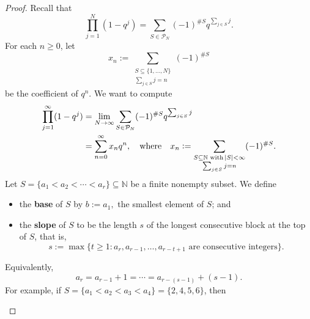 \documentclass{article}
\theoremstyle{definition}
\renewcommand{\emph}[1]{\textbf{#1}}
\begin{document}
\begin{proof}
Recall that \[
\prod_{j=1}^N(1-q^j)=\sum_{S\in\mathcal P_N}(-1)^{\#S}q^{\sum_{j\in S}j}.
\] For each $n\ge 0$, let \[
x_n
:=
\sum_{\substack{S\subseteq\{1,\dots,N\}\\ \sum_{j\in S}j=n}}(-1)^{\#S}
\] be the coefficient of $q^n$.
We want to compute \begin{align*}
\prod_{j=1}^\infty(1-q^j)&=\lim_{N\to\infty}\sum_{S\in\mathcal P_N}(-1)^{\#S}q^{\sum_{j\in S}j}\\
&=
\sum_{n=0}^\infty x_nq^n,\quad\text{where}\quad
x_n:=\sum_{\substack{S\subseteq\mathbb N\text{ with } \abs{S}<\infty\\ \sum_{j\in S}j=n}}(-1)^{\#S}.
\end{align*}
Let $
S=\{a_1<a_2<\cdots<a_r\}\subseteq\mathbb N$
be a finite nonempty subset. We define 
\begin{itemize}
	\item the \emph{base} of $S$ by $b:=a_1,$ the smallest element of $S$; and
	\item the \emph{slope} of $S$ to be the length $s$ of the longest consecutive block at the top of $S$, that is, \[
	s:=\max\{t\ge 1: a_r,a_{r-1},\dots,a_{r-t+1}\text{ are consecutive integers}\}.
	\]
\end{itemize}
Equivalently, \[
a_r=a_{r-1}+1=\cdots=a_{r-(s-1)}+(s-1).
\] 
\newpage\noindent
For example, if $S=\{a_1 < a_2 < a_3 < a_4\} = \{2, 4, 5, 6\}$, then

\begin{center}
\end{center}
\end{proof}
\end{document}
